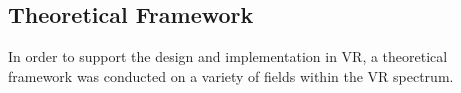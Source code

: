 \subsection{Theoretical Framework}
In order to support the design and implementation in VR, a theoretical framework was conducted on a variety of fields within the VR spectrum.  
